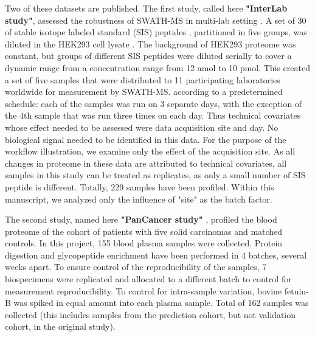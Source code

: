 \documentclass[num-refs]{wiley-article}
\begin{document}
Two of these datasets are published. The first study, called here \textbf{"InterLab study"}, assessed the robustness of SWATH-MS in multi-lab setting \cite{Collins2017}. A set of 30 of stable isotope labeled standard (SIS) peptides \cite{Ebhardt2012}, partitioned in five groups, was diluted in the HEK293 cell lysate . The background of HEK293 proteome was constant, but groups of different SIS peptides were diluted serially to cover a dynamic range from a concentration range from 12 amol to 10 pmol. This created a set of five samples that were distributed to 11 participating laboratories worldwide for measurement by SWATH-MS. according to a predetermined schedule: each of the samples was run on 3 separate days, with the exception of the 4th sample that was run three times on each day. Thus technical covariates whose effect needed to be assessed were data acquisition site and day. No biological signal needed to be identified in this data. For the purpose of the workflow illustration, we examine only the effect of the acquisition site. As all changes in proteome in these data are attributed to technical covariates, all samples in this study can be treated as replicates, as only a small number of SIS peptide is different. Totally, 229 samples have been profiled. Within this manuscript, we analyzed only the influence of "site" as the batch factor.

The second study, named here \textbf{"PanCancer study"} \cite{Sajic2018}, profiled the blood proteome of the cohort of patients with five solid carcinomas and matched controls. In this project, 155 blood plasma samples were collected. Protein digestion and glycopeptide enrichment have been performed in 4 batches, several weeks apart. To ensure control of the reproducibility of the samples, 7 biospecimens were replicated and allocated to a different batch to control for measurement reproducibility. To control for intra-sample variation, bovine fetuin-B was spiked in equal amount into each plasma sample. Total of 162 samples was collected (this includes samples from the prediction cohort, but not validation cohort, in the original study).
\end{document}
